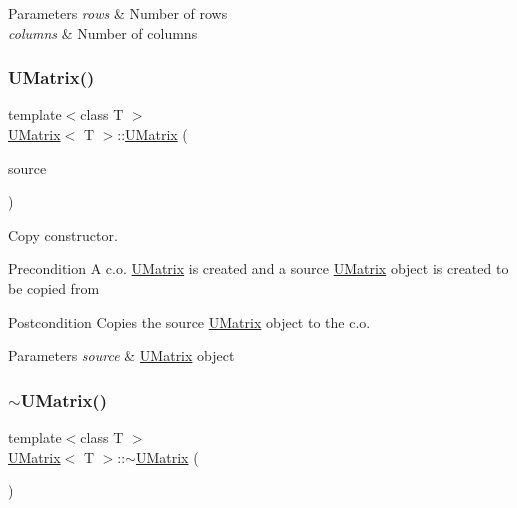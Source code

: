 \begin{DoxyParams}{Parameters}
{\em rows} & Number of rows \\
\hline
{\em columns} & Number of columns \\
\hline
\end{DoxyParams}
\mbox{\label{class_u_matrix_ab95abe504ff32df243d625b6b749077d}} 
\subsubsection{\texorpdfstring{UMatrix()}{UMatrix()}\hspace{0.1cm}{\footnotesize\ttfamily [3/3]}}
{\footnotesize\ttfamily template$<$class T $>$ \\
\mbox{\hyperlink{class_u_matrix}{U\+Matrix}}$<$ T $>$\+::\mbox{\hyperlink{class_u_matrix}{U\+Matrix}} (\begin{DoxyParamCaption}\item[{const \mbox{\hyperlink{class_u_matrix}{U\+Matrix}}$<$ T $>$ \&}]{source }\end{DoxyParamCaption})}



Copy constructor. 

\begin{DoxyPrecond}{Precondition}
A c.\+o. \mbox{\hyperlink{class_u_matrix}{U\+Matrix}} is created and a source \mbox{\hyperlink{class_u_matrix}{U\+Matrix}} object is created to be copied from 
\end{DoxyPrecond}
\begin{DoxyPostcond}{Postcondition}
Copies the source \mbox{\hyperlink{class_u_matrix}{U\+Matrix}} object to the c.\+o. 
\end{DoxyPostcond}

\begin{DoxyParams}{Parameters}
{\em source} & \mbox{\hyperlink{class_u_matrix}{U\+Matrix}} object \\
\hline
\end{DoxyParams}
\mbox{\label{class_u_matrix_ada29056d4baec18fcb9bc47dc49e8d53}} 
\subsubsection{\texorpdfstring{$\sim$UMatrix()}{~UMatrix()}}
{\footnotesize\ttfamily template$<$class T $>$ \\
\mbox{\hyperlink{class_u_matrix}{U\+Matrix}}$<$ T $>$\+::$\sim$\mbox{\hyperlink{class_u_matrix}{U\+Matrix}} (\begin{DoxyParamCaption}{ }\end{DoxyParamCaption})}



